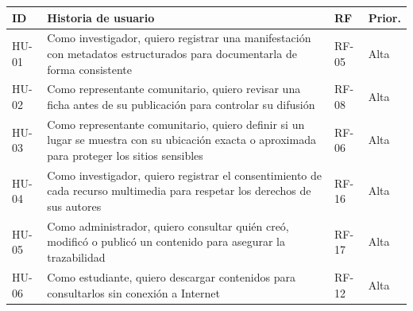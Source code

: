 {\centering\singlespacing
  \label{tab:historias}
  \begin{tabular}{|p{}|p{}|p{}|p{}|}
    \hline
    \textbf{ID} & \textbf{Historia de usuario} & \textbf{RF} & \textbf{Prior.} \tabularnewline
    \hline
    \raggedright\hspace{0pt}HU-01 & \raggedright\hspace{0pt}Como investigador, quiero registrar una manifestación con metadatos estructurados para documentarla de forma consistente & \raggedright\hspace{0pt}RF-05 & \raggedright\hspace{0pt}Alta \tabularnewline
    \hline
    \raggedright\hspace{0pt}HU-02 & \raggedright\hspace{0pt}Como representante comunitario, quiero revisar una ficha antes de su publicación para controlar su difusión & \raggedright\hspace{0pt}RF-08 & \raggedright\hspace{0pt}Alta \tabularnewline
    \hline
    \raggedright\hspace{0pt}HU-03 & \raggedright\hspace{0pt}Como representante comunitario, quiero definir si un lugar se muestra con su ubicación exacta o aproximada para proteger los sitios sensibles & \raggedright\hspace{0pt}RF-06 & \raggedright\hspace{0pt}Alta \tabularnewline
    \hline
    \raggedright\hspace{0pt}HU-04 & \raggedright\hspace{0pt}Como investigador, quiero registrar el consentimiento de cada recurso multimedia para respetar los derechos de sus autores & \raggedright\hspace{0pt}RF-16 & \raggedright\hspace{0pt}Alta \tabularnewline
    \hline
    \raggedright\hspace{0pt}HU-05 & \raggedright\hspace{0pt}Como administrador, quiero consultar quién creó, modificó o publicó un contenido para asegurar la trazabilidad & \raggedright\hspace{0pt}RF-17 & \raggedright\hspace{0pt}Alta \tabularnewline
    \hline
    \raggedright\hspace{0pt}HU-06 & \raggedright\hspace{0pt}Como estudiante, quiero descargar contenidos para consultarlos sin conexión a Internet & \raggedright\hspace{0pt}RF-12 & \raggedright\hspace{0pt}Alta \tabularnewline

\end{tabular}}
